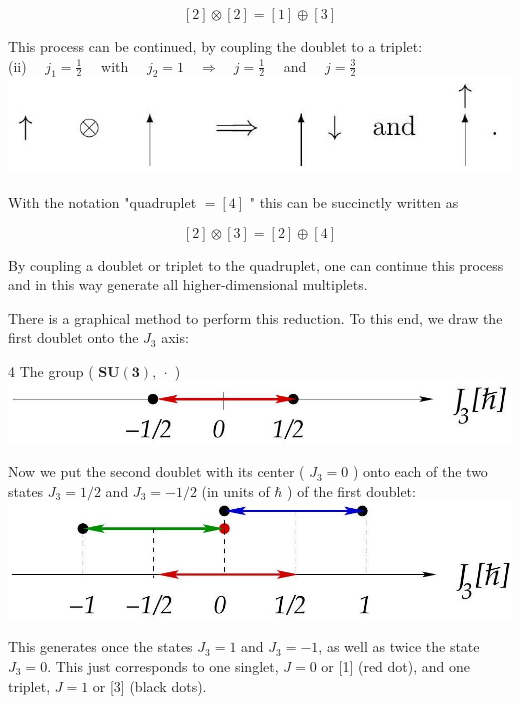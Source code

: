 \documentclass[10pt, letterpaper]{article}
\begin{document}
$$
[2] \otimes[2]=[1] \oplus[3]
$$

This process can be continued, by coupling the doublet to a triplet:\\
(ii) $\quad j_{1}=\frac{1}{2} \quad$ with $\quad j_{2}=1 \quad \Longrightarrow \quad j=\frac{1}{2} \quad$ and $\quad j=\frac{3}{2}$\\
\includegraphics[scale=0.3, center]{2025_05_20_8618f55a41bfe980b4b2g-53}

With the notation "quadruplet $=[4]$ " this can be succinctly written as

$$
[2] \otimes[3]=[2] \oplus[4]
$$

By coupling a doublet or triplet to the quadruplet, one can continue this process and in this way generate all higher-dimensional multiplets.

There is a graphical method to perform this reduction. To this end, we draw the first doublet onto the $J_{3}$ axis:

4 The group ( $\boldsymbol{S U} \mathbf{( 3 ) , ~} \cdot$ )\\
\includegraphics[scale=0.3, center]{2025_05_20_8618f55a41bfe980b4b2g-54(3)}

Now we put the second doublet with its center ( $J_{3}=0$ ) onto each of the two states $J_{3}=1 / 2$ and $J_{3}=-1 / 2$ (in units of $\hbar$ ) of the first doublet:\\
\includegraphics[scale=0.3, center]{2025_05_20_8618f55a41bfe980b4b2g-54(1)}

This generates once the states $J_{3}=1$ and $J_{3}=-1$, as well as twice the state $J_{3}=0$. This just corresponds to one singlet, $J=0$ or [1] (red dot), and one triplet, $J=1$ or [3] (black dots).
\end{document}
